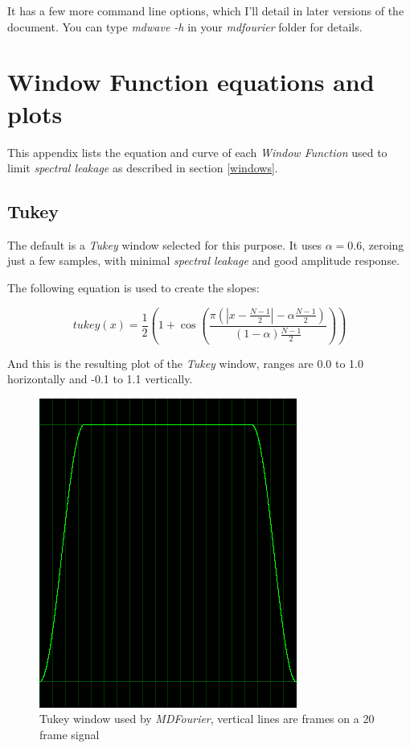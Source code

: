 \documentclass[10pt,a4paper]{report}
\begin{document}
\begin{appendices}
It has a few more command line options, which I'll detail in later versions of the document. You can type \textit{mdwave -h} in your \textit{mdfourier} folder for details.

\chapter{Window Function equations and plots}
\label{windowfunctiondetails}

This appendix lists the equation and curve of each \textit{Window Function} used to limit \textit{spectral leakage} as described in section \ref{windows}.

\newpage
\section{Tukey}

The default is a \textit{Tukey} window selected for this purpose. It uses $\alpha = 0.6$, zeroing just a few samples, with minimal \textit{spectral leakage} and good amplitude response.

The following equation is used to create the slopes:

\begin{equation}
tukey(x)=\frac{1}{2}(1+\cos(\frac{\pi(|x-\frac{N-1}{2}|-\alpha \frac{N-1}{2})}{(1-\alpha)\frac{N-1}{2}}))
\end{equation}

And this is the resulting plot of the \textit{Tukey} window, ranges are 0.0 to 1.0 horizontally and -0.1 to 1.1 vertically.

\begin{figure}[H]
	\centering
	\includegraphics[width=0.4\linewidth]{plots/window-tukey.png}
	\caption[Tukey Window]{Tukey window used by \textit{MDFourier}, vertical lines are frames on a 20 frame signal}
	\label{fig:window-tukey}
\end{figure}


\end{appendices}
\end{document}
